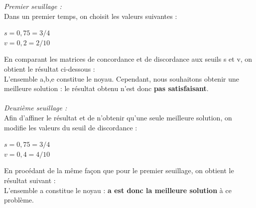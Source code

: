 \documentclass[a4paper, 11pt]{article}
\begin{document}
\emph{Premier seuillage :}\\
Dans un premier temps, on choisit les valeurs suivantes : 
\begin{center}
\textbf{$s = 0,75 = 3/4$\\
$v= 0,2 = 2/10$}
\end{center}
En comparant les matrices de concordance et de discordance aux seuils s et v, on obtient le résultat ci-dessous :\\
L’ensemble {a,b,e} constitue le noyau. Cependant, nous souhaitons obtenir une meilleure solution : le résultat obtenu n’est donc \textbf{pas satisfaisant}.\\\\

\emph{Deuxième seuillage :}\\
Afin d’affiner le résultat et de n’obtenir qu’une seule meilleure solution, on modifie les valeurs du seuil de discordance :\\
\begin{center}
\textbf{$s = 0,75 = 3/4$\\
$v= 0,4 = 4/10$}
\end{center}
En procédant de la même façon que pour le premier seuillage, on obtient le résultat suivant :\\
L’ensemble {a} constitue le noyau : \textbf{a est donc la meilleure solution} à ce problème.
\newpage
\end{document}
